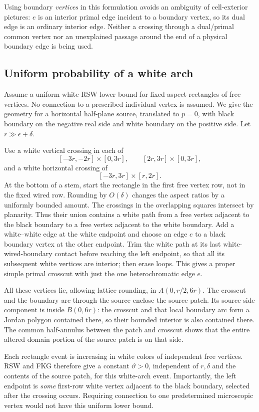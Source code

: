 \documentclass[11pt]{article}
\theoremstyle{definition}\newtheorem{definition}[theorem]{Definition}
\theoremstyle{remark}\newtheorem{remark}[theorem]{Remark}
\begin{document}
Using boundary \emph{vertices} in this formulation avoids an ambiguity of
cell-exterior pictures: $e$ is an interior primal edge incident to a boundary
vertex, so its dual edge is an ordinary interior edge. Neither a crossing
through a dual/primal common vertex nor an unexplained passage around the
end of a physical boundary edge is being used.

\subsection{Uniform probability of a white arch}

Assume a uniform white RSW lower bound for fixed-aspect rectangles of free
vertices. No connection to a prescribed individual vertex is assumed.
We give the geometry for a horizontal half-plane source, translated to $p=0$,
with black boundary on the negative real side and white boundary on the
positive side. Let $r\gg\epsilon+\delta$.

Use a white vertical crossing in each of
\[
 [-3r,-2r]\times[0,3r],\qquad [2r,3r]\times[0,3r],
\]
and a white horizontal crossing of
\[
 [-3r,3r]\times[r,2r].
\]
At the bottom of a stem, start the rectangle in the first free vertex
row, not in the fixed wired row. Rounding by $O(\delta)$ changes the
aspect ratios by a uniformly bounded amount. The crossings in the
overlapping squares intersect by planarity. Thus their union contains a
white path from a free vertex adjacent to the black boundary to a free
vertex adjacent to the white boundary. Add a white--white edge at the
white endpoint and choose an edge $e$ to a black boundary vertex at the
other endpoint. Trim the white path at its last white-wired-boundary contact before reaching the left endpoint, so that all its subsequent white vertices are interior; then erase loops. This gives a proper simple primal crosscut with just the one heterochromatic edge $e$.

All these vertices lie, allowing lattice rounding, in
$A(0,r/2,6r)$. The crosscut and the boundary arc through the source
enclose the source patch. Its source-side component is inside $B(0,6r)$:
the crosscut and that local boundary arc form a Jordan polygon contained
there, so their bounded interior is also contained there. The common
half-annulus between the patch and crosscut shows that the entire altered
domain portion of the source patch is on that side.

Each rectangle event is increasing in white colors of independent free
vertices. RSW and FKG therefore give a constant $\vartheta>0$, independent
of $r,\delta$ and the contents of the source patch, for this white-arch
event. Importantly, the left endpoint is \emph{some} first-row white vertex
adjacent to the black boundary, selected after the crossing occurs. Requiring
connection to one predetermined microscopic vertex would not have this
uniform lower bound.
\end{document}
